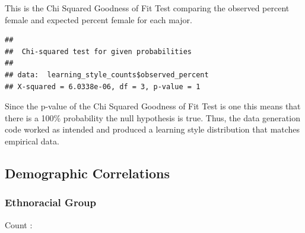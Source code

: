 \documentclass[
  twocolumn]{article}
\newenvironment{Shaded}{\begin{snugshade}}{\end{snugshade}}
\newcommand{\AttributeTok}[1]{\textcolor[rgb]{0.13,0.29,0.53}{#1}}
\newcommand{\CommentTok}[1]{\textcolor[rgb]{0.56,0.35,0.01}{\textit{#1}}}
\newcommand{\FunctionTok}[1]{\textcolor[rgb]{0.13,0.29,0.53}{\textbf{#1}}}
\newcommand{\NormalTok}[1]{#1}
\newcommand{\SpecialCharTok}[1]{\textcolor[rgb]{0.81,0.36,0.00}{\textbf{#1}}}
\begin{document}
This is the Chi Squared Goodness of Fit Test comparing the observed
percent female and expected percent female for each major.

\begin{Shaded}
\end{Shaded}

\begin{verbatim}
## 
##  Chi-squared test for given probabilities
## 
## data:  learning_style_counts$observed_percent
## X-squared = 6.0338e-06, df = 3, p-value = 1
\end{verbatim}

Since the p-value of the Chi Squared Goodness of Fit Test is one this
means that there is a 100\% probability the null hypothesis is true.
Thus, the data generation code worked as intended and produced a
learning style distribution that matches empirical data.

\subsection{Demographic Correlations}\label{demographic-correlations-2}

\subsubsection{Ethnoracial Group}\label{ethnoracial-group-2}

\begin{Shaded}
\end{Shaded}

Count :
\end{document}
